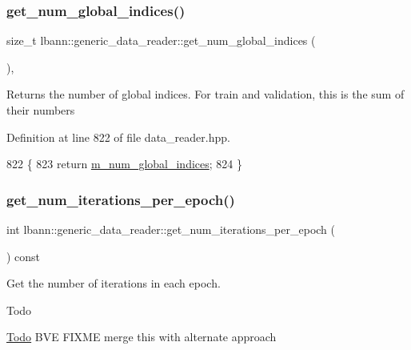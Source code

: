 \subsubsection{\texorpdfstring{get\+\_\+num\+\_\+global\+\_\+indices()}{get\_num\_global\_indices()}}
{\footnotesize\ttfamily size\+\_\+t lbann\+::generic\+\_\+data\+\_\+reader\+::get\+\_\+num\+\_\+global\+\_\+indices (\begin{DoxyParamCaption}{ }\end{DoxyParamCaption})\hspace{0.3cm}{\ttfamily [inline]}, {\ttfamily [protected]}}

Returns the number of global indices. For train and validation, this is the sum of their numbers 

Definition at line 822 of file data\+\_\+reader.\+hpp.


\begin{DoxyCode}
822                                   \{
823     \textcolor{keywordflow}{return} \hyperlink{classlbann_1_1generic__data__reader_ac6ea8dad1e9f0a8c939fd27d2de37e1b}{m\_num\_global\_indices};
824   \}
\end{DoxyCode}
\mbox{\label{classlbann_1_1generic__data__reader_a06fb58d1c0b84b8c76f5b4d160751f34}} 
\subsubsection{\texorpdfstring{get\+\_\+num\+\_\+iterations\+\_\+per\+\_\+epoch()}{get\_num\_iterations\_per\_epoch()}}
{\footnotesize\ttfamily int lbann\+::generic\+\_\+data\+\_\+reader\+::get\+\_\+num\+\_\+iterations\+\_\+per\+\_\+epoch (\begin{DoxyParamCaption}{ }\end{DoxyParamCaption}) const\hspace{0.3cm}{\ttfamily [inline]}}



Get the number of iterations in each epoch. 

\begin{DoxyRefDesc}{Todo}
\item[\hyperlink{todo__todo000019}{Todo}]B\+VE F\+I\+X\+ME merge this with alternate approach \end{DoxyRefDesc}


